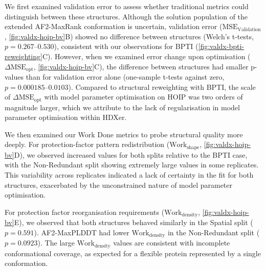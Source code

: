 We first examined validation error to assess whether traditional metrics could distinguish between these structures. Although the solution population of the extended AF2-MaxRank conformation is uncertain, validation error ($\text{MSE}_\text{Validation}$, \cref{fig:valdx-hoip-bv}B) showed no difference between structures (Welch's t-tests, $p=0.267$--$0.530$), consistent with our observations for BPTI (\cref{fig:valdx-bpti-reweighting}C). However, when we examined error change upon optimisation ($\Delta\text{MSE}_\text{opt}$, \cref{fig:valdx-hoip-bv}C), the difference between structures had smaller p-values than for validation error alone (one-sample t-tests against zero, $p=0.000185$--$0.0103$). Compared to structural reweighting with BPTI, the scale of $\Delta\text{MSE}_\text{opt}$ with model parameter optimisation on HOIP was two orders of magnitude larger, which we attribute to the lack of regularisation in model parameter optimisation within HDXer.

We then examined our Work Done metrics to probe structural quality more deeply. For protection-factor pattern redistribution ($\text{Work}_\text{shape}$, \cref{fig:valdx-hoip-bv}D), we observed increased values for both splits relative to the BPTI case, with the Non-Redundant split showing extremely large values in some replicates. This variability across replicates indicated a lack of certainty in the fit for both structures, exacerbated by the unconstrained nature of model parameter optimisation.

For protection factor reorganisation requirements ($\text{Work}_\text{density}$, \cref{fig:valdx-hoip-bv}E), we observed that both structures behaved similarly in the Spatial split ($p=0.591$). AF2-MaxPLDDT had lower $\text{Work}_\text{density}$ in the Non-Redundant split ($p=0.0923$). The large $\text{Work}_\text{density}$ values are consistent with incomplete conformational coverage, as expected for a flexible protein represented by a single conformation.


